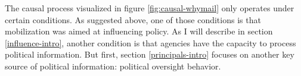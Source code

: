 

The causal process visualized in figure \ref{fig:causal-whymail} only operates under certain conditions. 
As suggested above, one of those conditions is that mobilization was aimed at influencing policy. 
As I will describe in section \ref{influence-intro}, another condition is that agencies have the capacity to process political information. 
But first, section \ref{principals-intro} focuses on another key source of political information: political oversight behavior.
